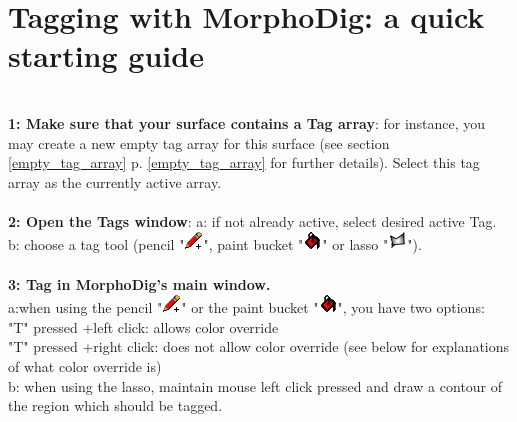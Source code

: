 \section{Tagging with MorphoDig: a quick starting guide}\label{tag_starting_guide}
\textbf{\underline{}}\\
\textbf{1: Make sure that your surface contains a Tag array}: for instance, you may create a new empty tag array for this surface (see section \ref{empty_tag_array} p. \ref{empty_tag_array} for further details). Select this tag array as the currently active array.\\\\
\noindent
\textbf{2: Open the Tags window}: a: if not already active, select desired active Tag. b: choose a tag tool (pencil "\includegraphics[scale=0.7]{images/12/pencil.png}", paint bucket "\includegraphics[scale=0.7]{images/12/paint_bucket.png}" or lasso "\includegraphics[scale=0.7]{images/12/lasso.png}").  \\\\
\noindent
\textbf{3: Tag in MorphoDig's main window.} \\ a:when using the pencil "\includegraphics[scale=0.7]{images/12/pencil.png}" or the paint bucket "\includegraphics[scale=0.7]{images/12/paint_bucket.png}", you have two options:\\
 "T" pressed +left click: allows color override\\
 "T" pressed +right click: does not allow color override (see below for explanations of what color override is)\\
b: when using the lasso, maintain mouse left click pressed and draw a contour of the region which should be tagged.



